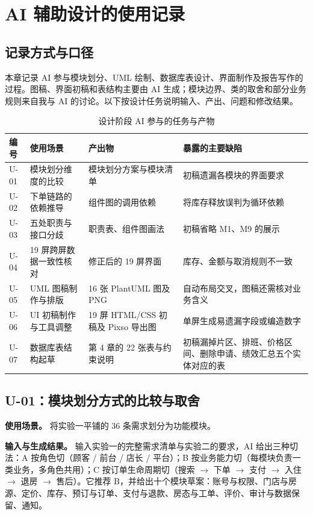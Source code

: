 \section{AI 辅助设计的使用记录}

\subsection{记录方式与口径}

本章记录 AI 参与模块划分、UML 绘制、数据库表设计、界面制作及报告写作的过程。图稿、界面初稿和表结构主要由 AI 生成；模块边界、类的取舍和部分业务规则来自我与 AI 的讨论。以下按设计任务说明输入、产出、问题和修改结果。

\begin{table}[H]
\centering
\caption{设计阶段 AI 参与的任务与产物}
\tabfont
\begin{tabularx}{\textwidth}{@{}L{1.3cm}L{3.0cm}L{3.4cm}X@{}}
\toprule
编号 & 使用场景 & 产出物 & 暴露的主要缺陷 \\
\midrule
U-01 & 模块划分维度的比较 & 模块划分方案与模块清单 & 初稿遗漏各模块的界面要求 \\
U-02 & 下单链路的依赖推导 & 组件图的调用依赖 & 将库存释放误判为循环依赖 \\
U-03 & 五处职责与接口分歧 & 职责表、组件图画法 & 初稿省略 M1、M9 的展示 \\
U-04 & 19 屏跨屏数据一致性核对 & 修正后的 19 屏界面 & 库存、金额与取消规则不一致 \\
U-05 & UML 图稿制作与排版 & 16 张 PlantUML 图及 PNG & 自动布局交叉，图稿还需核对业务含义 \\
U-06 & UI 初稿制作与工具调整 & 19 屏 HTML/CSS 初稿及 Pixso 导出图 & 单屏生成易遗漏字段或编造数字 \\
U-07 & 数据库表结构起草 & 第 4 章的 22 张表与约束说明 & 初稿漏掉片区、排班、价格区间、删除申请、绩效汇总五个实体对应的表 \\
\bottomrule
\end{tabularx}
\end{table}

\subsection{U-01：模块划分方式的比较与取舍}

\textbf{使用场景。} 将实验一平铺的 36 条需求划分为功能模块。

\textbf{输入与生成结果。} 输入实验一的完整需求清单与实验二的要求，AI 给出三种切法：A 按角色切（顾客 / 前台 / 店长 / 平台）；B 按业务能力切（每模块负责一类业务，多角色共用）；C 按订单生命周期切（搜索 $\rightarrow$ 下单 $\rightarrow$ 支付 $\rightarrow$ 入住 $\rightarrow$ 退房 $\rightarrow$ 售后）。它推荐 B，并给出十个模块草案：账号与权限、门店与房源、定价、库存、预订与订单、支付与退款、房态与工单、评价、审计与数据保留、通知。

